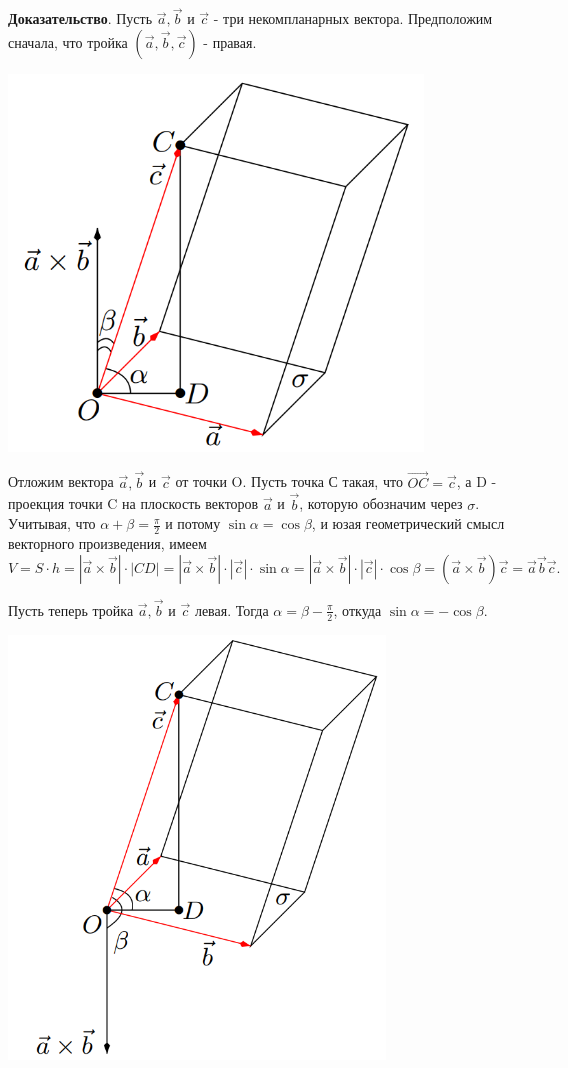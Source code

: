 \documentclass[a4paper]{article}
\begin{document}
\begin{hproof}
\textbf{Доказательство}. Пусть $\vec{a}, \vec{b}$ и $\vec{c}$ - три некомпланарных вектора. Предположим сначала, что тройка $(\vec{a}, \vec{b}, \vec{c})$ - правая.

\includegraphics[width=11cm]{t4}


Отложим вектора $\vec{a}, \vec{b}$ и $\vec{c}$ от точки O. Пусть точка С такая, что $\overrightarrow{OC} = \vec{c}$, а D - проекция точки C на плоскость векторов $\vec{a}$ и $\vec{b}$, которую обозначим через $\sigma$. Учитывая, что $\alpha + \beta = \frac{\pi}{2}$ и потому $\sin \alpha = \cos \beta$, и юзая геометрический смысл векторного произведения, имеем 
\begin{equation}
V = S \cdot h =  | \vec{a} \times \vec{b} | \cdot | CD | = |\vec{a} \times \vec{b}| \cdot | \vec{c} | \cdot \sin \alpha = |\vec{a} \times \vec{b}| \cdot | \vec{c} | \cdot \cos \beta = ( \vec{a} \times \vec{b}) \vec{c} = \vec{a} \vec{b} \vec{c}.
\end{equation}

Пусть теперь тройка $\vec{a}, \vec{b}$ и $\vec{c}$ левая. Тогда $\alpha = \beta - \frac{\pi}{2}$, откуда $\sin \alpha = - \cos \beta$.

\includegraphics[width=10cm]{t5}


\end{hproof}
\end{document}
